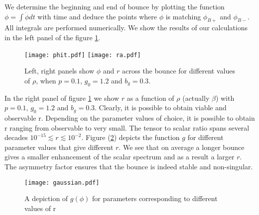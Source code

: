 \documentclass[12pt,a4paper]{article}
\numberwithin{equation}{section}
\numberwithin{equation}{section}
\begin{document}
 We determine the beginning and end of bounce by plotting the function $\phi=\int \dot{\phi}dt$ with time and deduce the points where $\phi$ is matching $\phi_{B+}$ and $\phi_{B-}$. All integrals are performed numerically. We show the results of our calculations in the left panel of the figure \ref{fig:r}.
 \begin{figure}[H]
    \centering
    \texttt{[image: phit.pdf]} 
    \hspace{0.5cm}
     \texttt{[image: ra.pdf]} 
     \caption{ Left,  right panels show $\phi$ and $r$ across the bounce for different values of $\rho$, when $p=0.1$, $g_0=1.2$ and $b_g=0.3$.} 
 \label{fig:r}
\end{figure}
In the right panel of figure \ref{fig:r} we show $r$ as a function of $\rho$ (actually $\beta$) with $p=0.1$, $g_0=1.2$ and $b_g=0.3$. Clearly, it is possible to obtain viable and observable r. Depending on the parameter values of choice, it is possible to obtain r ranging from observable to very small. %
The tensor to scalar ratio spans several decades $10^{-15}\lesssim r \lesssim 10^{-2}$. %
Figure (\ref{fig:g}) depicts the function $g$ for different parameter values that give different $r$. We see that on average a longer bounce gives a smaller enhancement of the scalar spectrum and as a result a larger $r$. The asymmetry factor ensures that the bounce is indeed stable and non-singular.
\begin{figure}[H]
    \centering
    \texttt{[image: gaussian.pdf]} 
     \caption{A depiction of $g(\phi)$ for parameters corresponding to different values of r} 
 \label{fig:g}
\end{figure}
\end{document}
